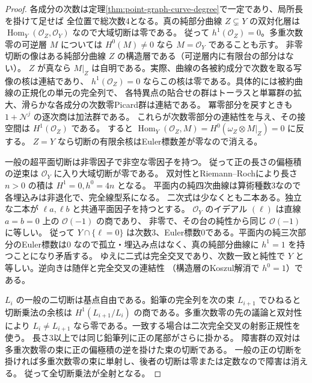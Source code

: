 \begin{proof}
各成分の次数は定理\ref{thm:point-graph-curve-degree}で一定であり、局所長を掛けて足せば
全位置で総次数4となる。真の純部分曲線 $Z\subsetneq Y$ の双対化層は
$\operatorname{Hom}_Y(\mathcal O_Z,\mathcal O_Y)$ なので大域切断は零である。
従って $h^1(\mathcal O_Z)=0$。多重次数零の可逆層 $M$ については
$H^0(M)\ne0$ なら $M=\mathcal O_Y$ であることも示す。
非零切断の像はある純部分曲線 $Z$ の構造層である（可逆層内に有限台の部分はない）。
$Z$ が真なら $M|_Z$ は自明である。実際、曲線の各被約成分で次数を取る写像の核は連結であり、
$h^1(\mathcal O_Z)=0$ ならこの核は零である。具体的には被約曲線の正規化の単元の完全列で、
各特異点の貼合せの群はトーラスと単冪群の拡大、滑らかな各成分の次数零Picard群は連結である。
冪零部分を戻すときも $1+\mathcal N^j$ の逐次商は加法群である。
これらが次数零部分の連結性を与え、その接空間は $H^1(\mathcal O_Z)$ である。
すると $\operatorname{Hom}_Y(\mathcal O_Z,M)=H^0(\omega_Z\otimes M|_Z)=0$ に反する。
$Z=Y$ なら切断の有限余核はEuler標数差が零なので消える。

一般の超平面切断は非零因子で非空な零因子を持つ。
従って正の長さの偏極積の逆束は $\mathcal O_Y$ に入り大域切断が零である。
双対性とRiemann--Rochにより長さ $n>0$ の積は $H^1=0,h^0=4n$ となる。
平面内の純四次曲線は算術種数3なので各埋込みは非退化で、完全線型系になる。
二次式は少なくとも二本ある。独立な二本が $\ell a,\ell b$ と共通平面因子を持つとする。
$\mathcal O_Y$ のイデアル $(\ell)$ は直線 $a=b=0$ 上の $\mathcal O(-1)$ の商であり、
非零で、その台の純性から同じ $\mathcal O(-1)$ に等しい。
従って $Y\cap\{\ell=0\}$ は次数3、Euler標数0である。平面内の純三次部分のEuler標数は0
なので孤立・埋込み点はなく、真の純部分曲線に $h^1=1$ を持つことになり矛盾する。
ゆえに二式は完全交叉であり、次数一致と純性で $Y$ と等しい。逆向きは随伴と完全交叉の連結性
（構造層のKoszul解消で $h^0=1$）である。

$L_i$ の一般の二切断は基点自由である。鉛筆の完全列を次の束 $L_{i+1}$ でひねると
切断乗法の余核は $H^1(L_{i+1}/L_i)$ の商である。多重次数零の先の議論と双対性により
$L_i\ne L_{i+1}$ なら零である。一致する場合は二次完全交叉の射影正規性を使う。
長さ3以上では同じ鉛筆列に正の尾部がさらに掛かる。
障害群の双対は多重次数零の束に正の偏極積の逆を掛けた束の切断である。
一般の正の切断を掛ければ多重次数零の束に単射し、後者の切断は零または定数なので障害は消える。
従って全切断乗法が全射となる。
\end{proof}

